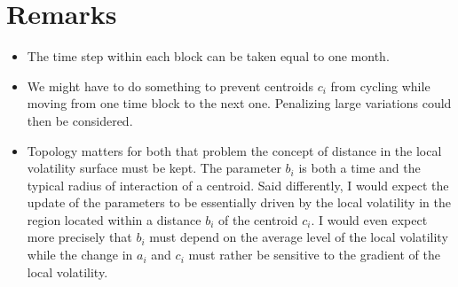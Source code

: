 \documentclass[10pt,a4paper]{article}
\begin{document}
\section{Remarks}
\begin{itemize}
\item The time step within each block can be taken equal to one month.
\item We might have to do something to prevent centroids $c_i$ from cycling while moving from one time block to the next one. Penalizing large variations could then be considered.
\item Topology matters for both that problem the concept of distance in the local volatility surface must be kept. The parameter $b_i$ is both a time and the typical radius of interaction of a centroid. Said differently, I would expect the update of the parameters to be essentially driven by the local volatility in the region located within a distance $b_i$ of the centroid $c_i$. I would even expect more precisely that $b_i$ must depend on the average level of the local volatility while the change in $a_i$ and $c_i$ must rather be sensitive to the gradient of the local volatility.
\end{itemize}
\end{document}
